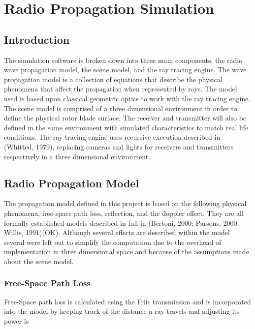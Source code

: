 \chapter{Radio Propagation Simulation} \label{ch:radio_propagation}

\section{Introduction}
The simulation software is broken down into three main components, the radio wave propagation model, the scene model, and the ray tracing engine. The wave propagation model is a collection of equations that describe the physical phenomena that affect the propagation when represented by rays. The model used is based upon classical geometric optics to work with the ray tracing engine. The scene model is comprised of a three dimensional environment in order to define the physical rotor blade surface. The receiver and transmitter will also be defined in the same environment with simulated characteristics to match real life conditions. The ray tracing engine uses recursive execution described in (Whitted, 1979), replacing cameras and lights for receivers and transmitters respectively in a three dimensional environment.

\section{Radio Propagation Model}
The propagation model defined in this project is based on the following physical phenomena, free-space path loss, reflection, and the doppler effect. They are all formally established models described in full in (Bertoni, 2000; Parsons, 2000; Willis, 1991)(OK). Although several effects are described within the model several were left out to simplify the computation due to the overhead of implementation in three dimensional space and because of the assumptions made about the scene model.

\subsection{Free-Space Path Loss}
Free-Space path loss is calculated using the Friis transmission and is incorporated into the model by keeping track of the distance a ray travels and adjusting its power is

